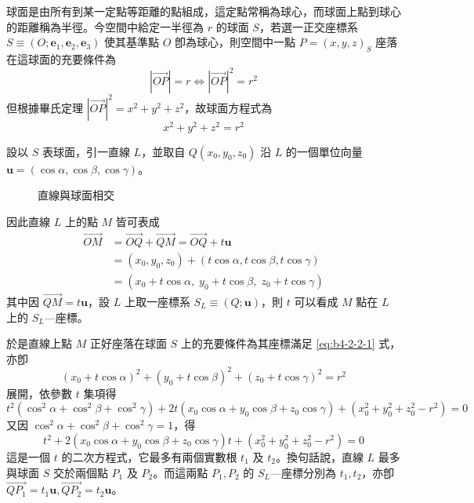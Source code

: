 球面是由所有到某一定點等距離的點組成，這定點常稱為球心，而球面上點到球心的距離稱為半徑。今空間中給定一半徑為 $r$ 的球面 $S$，若選一正交座標系 $S \equiv (O; \mathbf{e}_1, \mathbf{e}_2, \mathbf{e}_3)$ 使其基準點 $O$ 卽為球心，則空間中一點 $P = (x, y, z)_S$ 座落在這球面的充要條件為
\[ |\vec{OP}| = r \iff |\vec{OP}|^2 = r^2 \]
但根據畢氏定理 $|\vec{OP}|^2 = x^2 + y^2 + z^2$，故球面方程式為
\begin{equation}
x^2 + y^2 + z^2 = r^2 \label{eq:b4-2-2-1}
\end{equation}

設以 $S$ 表球面，引一直線 $L$，並取自 $Q(x_0, y_0, z_0)$ 沿 $L$ 的一個單位向量 $\mathbf{u} = (\cos\alpha, \cos\beta, \cos\gamma)$。

\begin{figure}[H]
\centering
{}
\caption{直線與球面相交}
\label{fig:b4-2-2-2}
\end{figure}

因此直線 $L$ 上的點 $M$ 皆可表成
\begin{align*}
\vec{OM} &= \vec{OQ} + \vec{QM} = \vec{OQ} + t\mathbf{u} \\
&= (x_0, y_0, z_0) + (t\cos\alpha, t\cos\beta, t\cos\gamma) \\
&= (x_0 + t\cos\alpha, \; y_0 + t\cos\beta, \; z_0 + t\cos\gamma)
\end{align*}
其中因 $\vec{QM} = t\mathbf{u}$，設 $L$ 上取一座標系 $S_L \equiv (Q; \mathbf{u})$，則 $t$ 可以看成 $M$ 點在 $L$ 上的 $S_L$---座標。

於是直線上點 $M$ 正好座落在球面 $S$ 上的充要條件為其座標滿足 \eqref{eq:b4-2-2-1} 式，亦卽
\[ (x_0 + t\cos\alpha)^2 + (y_0 + t\cos\beta)^2 + (z_0 + t\cos\gamma)^2 = r^2 \]
展開，依參數 $t$ 集項得
\[ t^2(\cos^2\alpha + \cos^2\beta + \cos^2\gamma) + 2t(x_0\cos\alpha + y_0\cos\beta + z_0\cos\gamma) + (x_0^2 + y_0^2 + z_0^2 - r^2) = 0 \]
又因 $\cos^2\alpha + \cos^2\beta + \cos^2\gamma = 1$，得
\begin{equation}
t^2 + 2(x_0\cos\alpha + y_0\cos\beta + z_0\cos\gamma)t + (x_0^2 + y_0^2 + z_0^2 - r^2) = 0 \label{eq:b4-2-2-2}
\end{equation}
這是一個 $t$ 的二次方程式，它最多有兩個實數根 $t_1$ 及 $t_2$。換句話說，直線 $L$ 最多與球面 $S$ 交於兩個點 $P_1$ 及 $P_2$。而這兩點 $P_1, P_2$ 的 $S_L$---座標分別為 $t_1, t_2$，亦卽 $\vec{QP_1} = t_1\mathbf{u}, \vec{QP_2} = t_2\mathbf{u}$。

